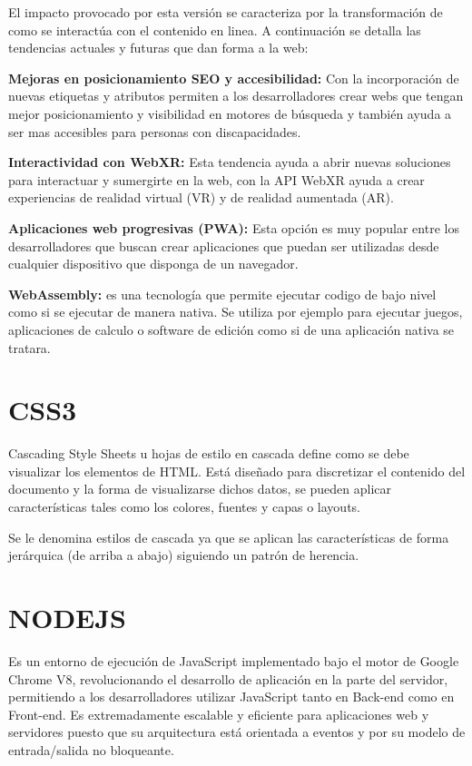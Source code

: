 \documentclass[a4paper, 12pt]{book}
\begin{document}
El impacto provocado por esta versión se caracteriza por la transformación de como se interactúa con el contenido en linea. A continuación se detalla las tendencias actuales y futuras que dan forma a la web:

\textbf{Mejoras en posicionamiento SEO y accesibilidad:} Con la incorporación de nuevas etiquetas y atributos permiten a los desarrolladores crear webs que tengan mejor posicionamiento y visibilidad en motores de búsqueda y también ayuda a ser mas accesibles para personas con discapacidades.

\textbf{Interactividad con WebXR:} Esta tendencia ayuda a abrir nuevas soluciones para interactuar y sumergirte en la web, con la API WebXR ayuda a crear experiencias de realidad virtual (VR) y de realidad aumentada (AR).

\textbf{Aplicaciones web progresivas (PWA):} Esta opción es muy popular entre los desarrolladores que buscan crear aplicaciones que puedan ser utilizadas desde cualquier dispositivo que disponga de un navegador.

\textbf{WebAssembly:} es una tecnología que permite ejecutar codigo de bajo nivel como si se ejecutar de manera nativa. Se utiliza por ejemplo para ejecutar juegos, aplicaciones de calculo o software de edición como si de una aplicación nativa se tratara.

\section{CSS3}
Cascading Style Sheets u hojas de estilo en cascada define como se debe visualizar los elementos de HTML. Está diseñado para discretizar el contenido del documento y la forma de visualizarse dichos datos, se pueden aplicar características tales como los colores, fuentes y capas o layouts.

Se le denomina estilos de cascada ya que se aplican las características de forma jerárquica (de arriba a abajo) siguiendo un patrón de herencia.

\section{NODEJS}

Es un entorno de ejecución de JavaScript implementado bajo el motor de Google Chrome V8, revolucionando el desarrollo de aplicación en la parte del servidor, permitiendo a los desarrolladores utilizar JavaScript tanto en Back-end como en Front-end. Es extremadamente escalable y eficiente para aplicaciones web y servidores puesto que su arquitectura está orientada a eventos y por su modelo de entrada/salida no bloqueante.
\end{document}
